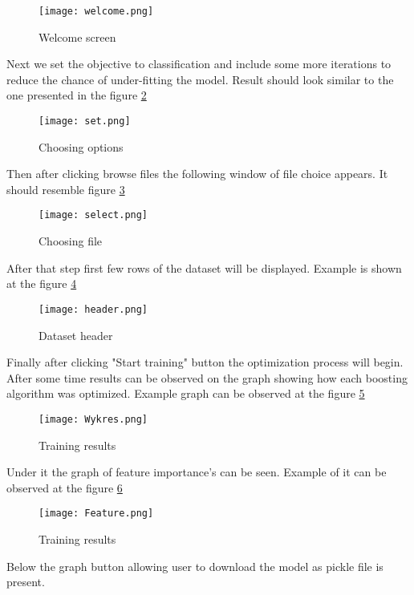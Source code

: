 \documentclass[a4paper,twoside,12pt]{book}
\begin{document}
\begin{figure}[h]
    \centering
    \texttt{[image: welcome.png]}
    \caption{Welcome screen}
    \label{fig:welcome}
\end{figure}

Next we set the objective to classification and include some more iterations to reduce the chance of under-fitting the model. Result should look similar to the one presented in the figure \ref{fig:set}

\begin{figure}[h]
    \centering
    \texttt{[image: set.png]}
    \caption{Choosing options}
    \label{fig:set}
\end{figure}

Then after clicking browse files the following window of file choice appears. It should resemble figure \ref{fig:select}

\begin{figure}[h]
    \centering
    \texttt{[image: select.png]}
    \caption{Choosing file}
    \label{fig:select}
\end{figure}

After that step first few rows of the dataset will be displayed. Example is shown at the figure \ref{fig:header}

\begin{figure}[h]
    \centering
    \texttt{[image: header.png]}
    \caption{Dataset header}
    \label{fig:header}
\end{figure}

Finally after clicking "Start training" button the optimization process will begin. After some time results can be observed on the graph showing how each boosting algorithm was optimized. Example graph can be observed at the figure \ref{fig:wykres}

\begin{figure}[h]
    \centering
    \texttt{[image: Wykres.png]}
    \caption{Training results}
    \label{fig:wykres}
\end{figure}

Under it the graph of feature importance's can be seen. Example of it can be observed at the figure \ref{fig:feature} 

\begin{figure}[h]
    \centering
    \texttt{[image: Feature.png]}
    \caption{Training results}
    \label{fig:feature}
\end{figure}


Below the graph button allowing user to download the model as pickle file is present.
\end{document}
